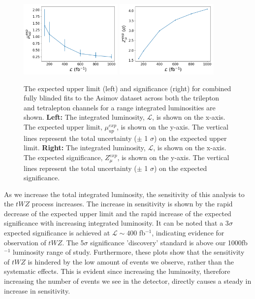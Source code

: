 \begin{figure}[h!]
    \centering
    \includegraphics[width=0.45\textwidth]{figures/combined/exp_upper.png}
    \includegraphics[width=0.45\textwidth]{figures/combined/signif.png}
    \caption{The expected upper limit (left) and significance (right) for combined fully blinded fits to the Asimov dataset across both the trilepton and tetralepton channels for a range integrated luminosities are shown. \textbf{Left: }The integrated luminosity, $\mathcal{L}$, is shown on the x-axis. The expected upper limit, $\mu_{up}^{exp}$, is shown on the y-axis. The vertical lines represent the total uncertainty ($\pm$ 1 $\sigma$) on the expected upper limit. \textbf{Right: }The integrated luminosity, $\mathcal{L}$, is shown on the x-axis. The expected significance, $Z_{\mu}^{exp}$, is shown on the y-axis. The vertical lines represent the total uncertainty ($\pm$ 1 $\sigma$) on the expected significance.}
    \label{fig:limit-sig-projection}
\end{figure}As we increase the total integrated luminosity, the sensitivity of this analysis to the $tWZ$ process increases. The increase in sensitivity is shown by the rapid decrease of the expected upper limit and the rapid increase of the expected significance with increasing integrated luminosity. It can be noted that a 3$\sigma$ expected significance is achieved at $\mathcal{L} \sim 400$ fb$^{-1}$, indicating evidence for observation of $tWZ$. The 5$\sigma$ significance 'discovery' standard is above our 1000fb$^{-1}$ luminosity range of study. Furthermore, these plots show that the sensitivity of $tWZ$ is hindered by the low amount of events we observe, rather than the systematic effects. This is evident since increasing the luminosity, therefore increasing the number of events we see in the detector, directly causes a steady in increase in sensitivity.

